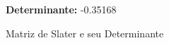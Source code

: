 \documentclass{article}
\begin{document}
\begin{figure}[h!]
\centering
\caption{Matriz de Slater e seu Determinante}
\label{fig:slaterMatrix}

\resizebox{\columnwidth}{!}{$
    \begin{bmatrix}
    \end{bmatrix}
$}
\textbf{Determinante:} -0.35168
\end{figure}
\end{document}
